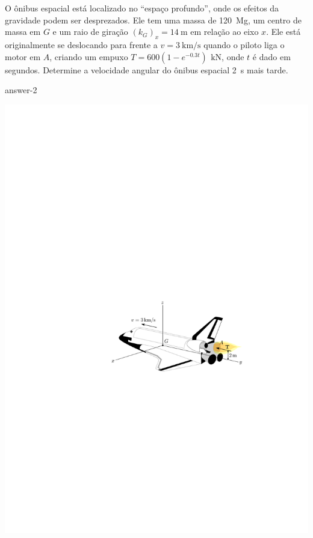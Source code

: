 \item O ônibus espacial está localizado no ``espaço profundo'', onde os efeitos da gravidade podem ser
desprezados. Ele tem uma massa de \SI{120}{\mega\gram}, um centro de massa em $G$ e um raio de giração $(k_{G})_{x}=\SI{14}{\meter}$ em relação ao eixo $x$. Ele está originalmente se deslocando para frente a $v=\SI{3}{\kilo\meter/\second}$ quando o piloto liga o motor em $A$, criando um empuxo $T=600(1-e^{-0.3t})\,\SI{}{\kilo\newton}$, onde $t$ é dado em segundos. Determine a velocidade angular do ônibus espacial \SI{2}{\second} mais tarde.

{answer-2}

\vspace{-.5cm}
\begin{flushright}
	\includegraphics[scale=1.3]{../../images/draw_1}
\end{flushright}